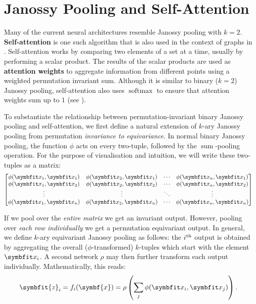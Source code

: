 \section{Janossy Pooling and Self-Attention}\label{sec:jan-attn}

Many of the current neural architectures resemble Janossy pooling with $k=2$.
\textbf{Self-attention} \parencite{vaswani2017attention} is one such algorithm that is also used in the context of graphs in \samptr. Self-attention works by comparing two elements of a set at a time, usually by performing a scalar product.
The results of the scalar products are used as \textbf{attention weights} to aggregate information from different points using a weighted permutation invariant sum. Although it is similar to binary ($k=2$) Janossy pooling, self-attention also uses $\operatorname{softmax}$ to ensure that attention weights sum up to $1$ (see ).

To substantiate the relationship between permutation-invariant binary Janossy pooling and self-attention, we first define a natural extension of $k$-ary Janossy pooling from permutation \textit{invariance to equivariance}. In normal binary Janossy pooling, the function $\phi$ acts on every two-tuple, followed by the $\operatorname{sum}$-pooling operation. For the purpose of visualisation and intuition, we will write these two-tuples as a matrix:
\begin{equation}
    \begin{bmatrix}
    \phi(\bfitx_1, \bfitx_1) & \phi(\bfitx_2, \bfitx_1) & \cdots & \phi(\bfitx_n, \bfitx_1) \\
    \phi(\bfitx_1, \bfitx_2) & \phi(\bfitx_2, \bfitx_2) & \cdots & \phi(\bfitx_n, \bfitx_2) \\
    \vdots                   &  \vdots              & \ddots & \vdots         \\
    \phi(\bfitx_1, \bfitx_n) & \phi(\bfitx_2, \bfitx_n) & \cdots & \phi(\bfitx_n, \bfitx_n)
    \end{bmatrix}
    \label{eqn:jan-attn-matrix}
\end{equation}

If we pool over the \textit{entire matrix} we get an invariant output. However, pooling over \textit{each row individually} we get a permutation equivariant output.
In general, we define $k$-ary equivariant Janossy pooling as follows: the $i\textsuperscript{th}$ output is obtained by aggregating the overall ($\phi$-transformed) $k$-tuples which start with the element $\bfitx_i$. A second network $\rho$ may then further transform each output individually. Mathematically, this reads:
\begin{equation}
    \symbfit{z}_i = f_i(\symbf{x}) = \rho \left( \sum_j \phi(\bfitx_i, \bfitx_j) \right).
    \label{eqn:janossy-attention}
\end{equation}

